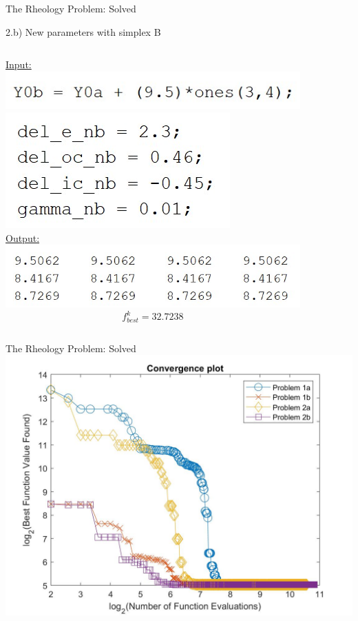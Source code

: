 \documentclass{beamer}
\begin{document}
\begin{frame}{The Rheology Problem: Solved}
\begin{block}{2.b) New parameters with simplex B}
\begin{columns}
\begin{column}{0.35\linewidth}
	\underline{Input:}\\
	\includegraphics[width=0.75\linewidth]{Y0b}\\
	\includegraphics[width=0.45\linewidth]{NewParamsB}\\
	\vspace{0.65cm}
	\underline{Output:}\\
	\includegraphics[width=0.95\linewidth]{1bSimplex}
	$$f^k_{best} = 32.7238$$
	\vspace{0.1cm}
\end{column}
\begin{column}{0.63\linewidth}
	\begin{figure}
	\end{figure}	
\end{column}
\end{columns}
\end{block}
\end{frame}

\begin{frame}{The Rheology Problem: Solved}
	\centering
	\includegraphics[width=0.85\linewidth]{convergencePlot}
\end{frame}
\end{document}
